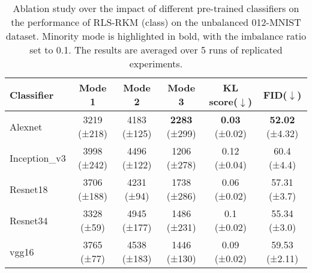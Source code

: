 \begin{table}[ht]
\centering
\begin{tabular}{lccccc}
\toprule
                     Classifier &      Mode 1 &      Mode 2 &      \textbf{Mode 3} &       KL score($\downarrow$) &           FID($\downarrow$) \\
\midrule
     Alexnet\cite{krizhevskyImageNetClassificationDeep2012} & 3219 (±218) & 4183 (±125) & \textbf{2283} (±299) & \textbf{0.03} (±0.02) & \textbf{52.02} (±4.32) \\
Inception\_v3\cite{szegedyRethinkingInceptionArchitecture2016} & 3998 (±242) & 4496 (±122) & 1206 (±278) & 0.12 (±0.04) &   60.4 (±4.4) \\
    Resnet18\cite{heDeepResidualLearning2016} & 3706 (±188) &  4231 (±94) & 1738 (±286) & 0.06 (±0.02) &  57.31 (±3.7) \\
    Resnet34\cite{heDeepResidualLearning2016} &  3328 (±59) & 4945 (±177) & 1486 (±231) &  0.1 (±0.02) &  55.34 (±3.0) \\
       vgg16\cite{simonyanVeryDeepConvolutional2015} &  3765 (±77) & 4538 (±183) & 1446 (±130) & 0.09 (±0.02) & 59.53 (±2.11) \\
\bottomrule
\end{tabular}
\caption{Ablation study over the impact of different pre-trained classifiers on the performance of RLS-RKM (class) on the unbalanced 012-MNIST dataset. Minority mode is highlighted in bold, with the imbalance ratio set to 0.1. The results are averaged over 5 runs of replicated experiments.}
\label{expr-different-classifiers}
\end{table}